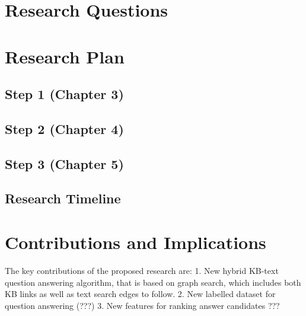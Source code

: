 \section{Research Questions}


\section{Research Plan}

\subsection{Step 1 (Chapter 3)}
\label{sec:plan1}

\subsection{Step 2 (Chapter 4)}
\label{sec:plan2}

\subsection{Step 3 (Chapter 5)}
\label{sec:plan3}

\subsection{Research Timeline}




\section{Contributions and Implications}

The key contributions of the proposed research are:
1. New hybrid KB-text question answering algorithm, that is based on graph search, which includes both KB links as well as text search edges to follow.
2. New labelled dataset for question answering (???)
3. New features for ranking answer candidates ???
